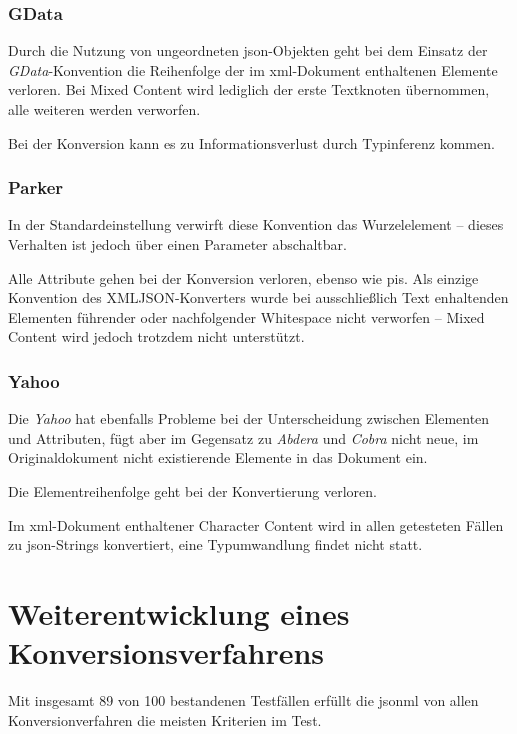 \subsection{GData}
\label{sec:xmljson-gdata}

Durch die Nutzung von ungeordneten \acrshort{json}-Objekten geht bei dem Einsatz der \emph{GData}-Konvention die Reihenfolge der im \acrshort{xml}-Dokument enthaltenen Elemente verloren. Bei Mixed Content wird lediglich der erste Textknoten übernommen, alle weiteren werden verworfen.

Bei der Konversion kann es zu Informationsverlust durch Typinferenz kommen.

\subsection{Parker}
\label{sec:xmljson-parker}

In der Standardeinstellung verwirft diese Konvention das Wurzelelement -- dieses Verhalten ist jedoch über einen Parameter abschaltbar.

Alle Attribute gehen bei der Konversion verloren, ebenso wie \glspl{pi}. Als einzige Konvention des XMLJSON-Konverters wurde bei ausschließlich Text enhaltenden Elementen führender oder nachfolgender Whitespace nicht verworfen -- Mixed Content wird jedoch trotzdem nicht unterstützt.

\subsection{Yahoo}
\label{sec:xmljson-yahoo}

Die \emph{Yahoo} hat ebenfalls Probleme bei der Unterscheidung zwischen Elementen und Attributen, fügt aber im Gegensatz zu \emph{Abdera} und \emph{Cobra} nicht neue, im Originaldokument nicht existierende Elemente in das Dokument ein.

Die Elementreihenfolge geht bei der Konvertierung verloren.

Im \acrshort{xml}-Dokument enthaltener Character Content wird in allen getesteten Fällen zu \acrshort{json}-Strings konvertiert, eine Typumwandlung findet nicht statt.

\chapter{Weiterentwicklung eines Konversionsverfahrens}
\label{chap:jsonml}

Mit insgesamt 89 von 100 bestandenen Testfällen erfüllt die \acrfull{jsonml} von allen Konversionverfahren die meisten Kriterien im Test.

